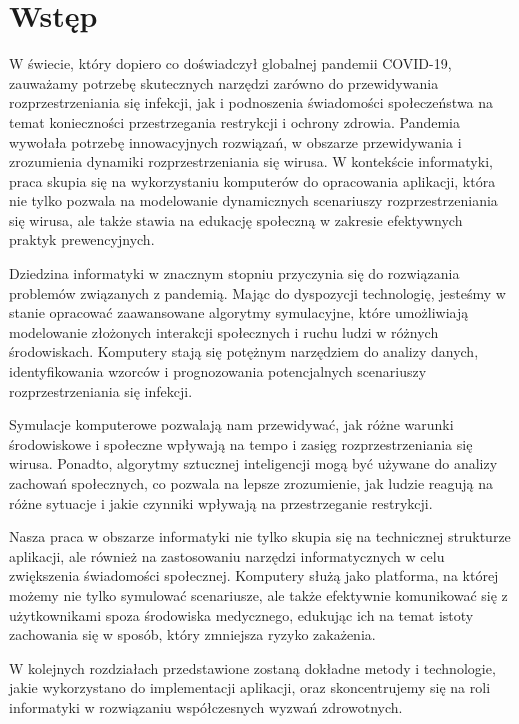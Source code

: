 \chapter{Wstęp}
\label{ch:wstep}

W świecie, który dopiero co doświadczył globalnej pandemii COVID-19, zauważamy potrzebę skutecznych narzędzi zarówno do przewidywania rozprzestrzeniania się infekcji, jak i podnoszenia świadomości społeczeństwa na temat konieczności przestrzegania restrykcji i ochrony zdrowia. Pandemia wywołała potrzebę innowacyjnych rozwiązań, w obszarze przewidywania i zrozumienia dynamiki rozprzestrzeniania się wirusa. W kontekście informatyki, praca skupia się na wykorzystaniu komputerów do opracowania aplikacji, która nie tylko pozwala na modelowanie dynamicznych scenariuszy rozprzestrzeniania się wirusa, ale także stawia na edukację społeczną w zakresie efektywnych praktyk prewencyjnych.

Dziedzina informatyki w znacznym stopniu przyczynia się do rozwiązania problemów związanych z pandemią. Mając do dyspozycji technologię, jesteśmy w stanie opracować zaawansowane algorytmy symulacyjne, które umożliwiają modelowanie złożonych interakcji społecznych i ruchu ludzi w różnych środowiskach. Komputery stają się potężnym narzędziem do analizy danych, identyfikowania wzorców i prognozowania potencjalnych scenariuszy rozprzestrzeniania się infekcji.

Symulacje komputerowe pozwalają nam przewidywać, jak różne warunki środowiskowe i społeczne wpływają na tempo i zasięg rozprzestrzeniania się wirusa. Ponadto, algorytmy sztucznej inteligencji mogą być używane do analizy zachowań społecznych, co pozwala na lepsze zrozumienie, jak ludzie reagują na różne sytuacje i jakie czynniki wpływają na przestrzeganie restrykcji.

Nasza praca w obszarze informatyki nie tylko skupia się na technicznej strukturze aplikacji, ale również na zastosowaniu narzędzi informatycznych w celu zwiększenia świadomości społecznej. Komputery służą jako platforma, na której możemy nie tylko symulować scenariusze, ale także efektywnie komunikować się z użytkownikami spoza środowiska medycznego, edukując ich na temat istoty zachowania się w sposób, który zmniejsza ryzyko zakażenia.

W kolejnych rozdziałach przedstawione zostaną dokładne metody i technologie, jakie wykorzystano do implementacji aplikacji, oraz skoncentrujemy się na roli informatyki w rozwiązaniu współczesnych wyzwań zdrowotnych.

